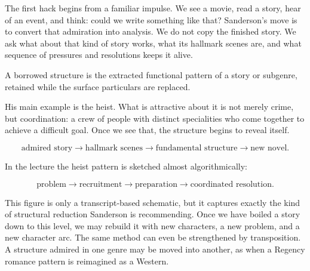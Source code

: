 The first hack begins from a familiar impulse. We see a movie, read a story, hear of an event, and think: could we write something like that? Sanderson's move is to convert that admiration into analysis. We do not copy the finished story. We ask what about that kind of story works, what its hallmark scenes are, and what sequence of pressures and resolutions keeps it alive.

\begin{definition}
A borrowed structure is the extracted functional pattern of a story or subgenre, retained while the surface particulars are replaced.
\end{definition}

His main example is the heist. What is attractive about it is not merely crime, but coordination: a crew of people with distinct specialities who come together to achieve a difficult goal. Once we see that, the structure begins to reveal itself.

\begin{equation}
\text{admired story} \to \text{hallmark scenes} \to \text{fundamental structure} \to \text{new novel}.
\end{equation}

In the lecture the heist pattern is sketched almost algorithmically:

\begin{equation}
\text{problem} \to \text{recruitment} \to \text{preparation} \to \text{coordinated resolution}.
\end{equation}

\begin{figure}
\centering
{}
\end{figure}

This figure is only a transcript-based schematic, but it captures exactly the kind of structural reduction Sanderson is recommending. Once we have boiled a story down to this level, we may rebuild it with new characters, a new problem, and a new character arc. The same method can even be strengthened by transposition. A structure admired in one genre may be moved into another, as when a Regency romance pattern is reimagined as a Western.

